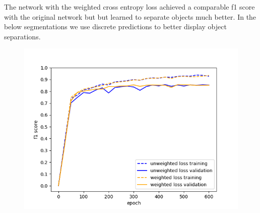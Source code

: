 \documentclass[a4paper,11pt]{article}
\begin{document}
The network with the weighted cross entropy loss achieved a comparable f1 score with the original network but but learned to separate objects much better. In the below segmentations we use discrete predictions to better display object separations.
\begin{center}
\begin{figure}[H]
      \includegraphics[scale=0.7]{weighted_vs_unweighted}
  \caption{} \label{fig:weighted_vs_unweighted}
\end{figure}
\end{center}
\end{document}

